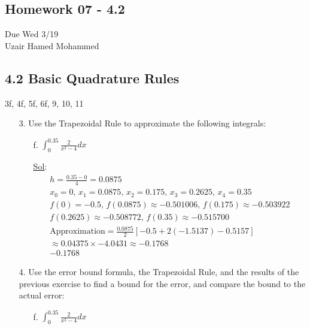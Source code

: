 \begin{center}
    \section*{Homework 07 - 4.2}
    Due Wed 3/19 \\
    Uzair Hamed Mohammed
  \end{center}
  
  \subsection*{4.2 Basic Quadrature Rules}
  
3f, 4f, 5f, 6f, 9, 10, 11

\begin{enumerate}
  \item[3.] Use the Trapezoidal Rule to approximate the following integrals:
  
    \begin{enumerate}
      \item[f.] \(\int_{0}^{0.35} \frac{2}{x^2 - 4} dx\)
  
      \underline{Sol}:\\

\[
    \begin{array}{l}
       h = \frac{0.35 - 0}{4} = 0.0875 \\
       x_0 = 0, \, x_1 = 0.0875, \, x_2 = 0.175, \, x_3 = 0.2625, \, x_4 = 0.35 \\
       f(0) = -0.5, \, f(0.0875) \approx -0.501006, \, f(0.175) \approx -0.503922 \\
       f(0.2625) \approx -0.508772, \, f(0.35) \approx -0.515700 \\
       \text{Approximation} = \frac{0.0875}{2} \left[ -0.5 + 2(-1.5137) - 0.5157 \right] \\
       \approx 0.04375 \times -4.0431 \approx -0.1768 \\
       \boxed{-0.1768}
    \end{array}
\]
    \end{enumerate}

  \item[4.] Use the error bound formula, the Trapezoidal Rule, and the results of the previous exercise to find a bound for the error, and compare the bound to the actual error:
  
  \begin{enumerate}
    \item[f.] \(\int_{0}^{0.35} \frac{2}{x^2 - 4} dx\)
    

\end{enumerate}
\end{enumerate}
